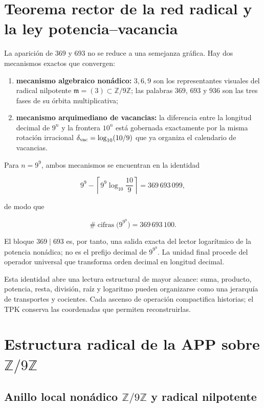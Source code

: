 \section{Teorema rector de la red radical y la ley potencia--vacancia}

La aparición de \(369\) y \(693\) no se reduce a una semejanza gráfica. Hay dos mecanismos exactos que convergen:

\begin{enumerate}
\item \textbf{mecanismo algebraico nonádico:} \(3,6,9\) son los representantes visuales del radical nilpotente \(\mathfrak m=(3)\subset\mathbb Z/9\mathbb Z\); las palabras \(369\), \(693\) y \(936\) son las tres fases de su órbita multiplicativa;
\item \textbf{mecanismo arquimediano de vacancias:} la diferencia entre la longitud decimal de \(9^n\) y la frontera \(10^n\) está gobernada exactamente por la misma rotación irracional \(\delta_{\rm vac}=\log_{10}(10/9)\) que ya organiza el calendario de vacancias.
\end{enumerate}

Para \(n=9^9\), ambos mecanismos se encuentran en la identidad

\[
9^9-\left\lceil 9^9\log_{10}\frac{10}{9}\right\rceil
=369\,693\,099,
\]

de modo que

\[
\#\operatorname{cifras}\bigl(9^{9^9}\bigr)=369\,693\,100.
\]

El bloque \(369\mid693\) es, por tanto, una salida exacta del lector logarítmico de la potencia nonádica; no es el prefijo decimal de \(9^{9^9}\). La unidad final procede del operador universal que transforma orden decimal en longitud decimal.

Esta identidad abre una lectura estructural de mayor alcance: suma, producto, potencia, resta, división, raíz y logaritmo pueden organizarse como una jerarquía de transportes y cocientes. Cada ascenso de operación compactifica historias; el TPK conserva las coordenadas que permiten reconstruirlas.


\section{Estructura radical de la APP sobre \(\mathbb Z/9\mathbb Z\)}

\subsection{Anillo local nonádico \(\mathbb Z/9\mathbb Z\) y radical nilpotente}

